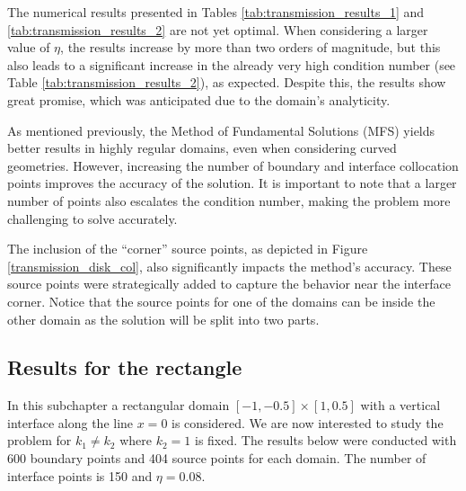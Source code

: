 The numerical results presented in Tables \ref{tab:transmission_results_1} and \ref{tab:transmission_results_2} are not yet optimal. When considering a larger value of \(\eta\), the results increase by more than two orders of magnitude, but this also leads to a significant increase in the already very high condition number (see Table \ref{tab:transmission_results_2}), as expected. Despite this, the results show great promise, which was anticipated due to the domain's analyticity.

As mentioned previously, the Method of Fundamental Solutions (\ac{MFS}) yields better results in highly regular domains, even when considering curved geometries. However, increasing the number of boundary and interface collocation points improves the accuracy of the solution. It is important to note that a larger number of points also escalates the condition number, making the problem more challenging to solve accurately.

The inclusion of the ``corner'' source points, as depicted in Figure \ref{transmission_disk_col}, also significantly impacts the method's accuracy. These source points were strategically added to capture the behavior near the interface corner. Notice that the source points for one of the domains can be inside the other domain as the solution will be split into two parts.

\subsection{Results for the rectangle}

In this subchapter a rectangular domain \([-1, -0.5] \times [1, 0.5]\) with a vertical interface along the line \(x=0\) is considered. We are now interested to study the problem for \(k_1 \neq k_2\) where \(k_2=1\) is fixed. The results below were conducted with 600 boundary points and 404 source points for each domain. The number of interface points is 150 and \(\eta=0.08\).

